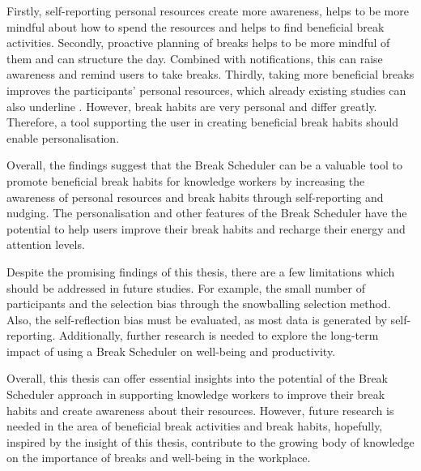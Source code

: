 \documentclass{hasel_thesis}
\begin{document}
Firstly, self-reporting personal resources create more awareness, helps to be more mindful about how to spend the resources and helps to find beneficial break activities. Secondly, proactive planning of breaks helps to be more mindful of them and can structure the day. Combined with notifications, this can raise awareness and remind users to take breaks. Thirdly, taking more beneficial breaks improves the participants' personal resources, which already existing studies can also underline \cite{Trougakos.2009}. However, break habits are very personal and differ greatly. Therefore, a tool supporting the user in creating beneficial break habits should enable personalisation.

Overall, the findings suggest that the Break Scheduler can be a valuable tool to promote beneficial break habits for knowledge workers by increasing the awareness of personal resources and break habits through self-reporting and nudging. The personalisation and other features of the Break Scheduler have the potential to help users improve their break habits and recharge their energy and attention levels.

Despite the promising findings of this thesis, there are a few limitations which should be addressed in future studies. For example, the small number of participants and the selection bias through the snowballing selection method. Also, the self-reflection bias must be evaluated, as most data is generated by self-reporting. Additionally, further research is needed to explore the long-term impact of using a Break Scheduler on well-being and productivity.

Overall, this thesis can offer essential insights into the potential of the Break Scheduler approach  in supporting knowledge workers to improve their break habits and create awareness about their resources. However, future research is needed in the area of beneficial break activities and break habits, hopefully, inspired by the insight of this thesis, contribute to the growing body of knowledge on the importance of breaks and well-being in the workplace.






% 

\end{document}
